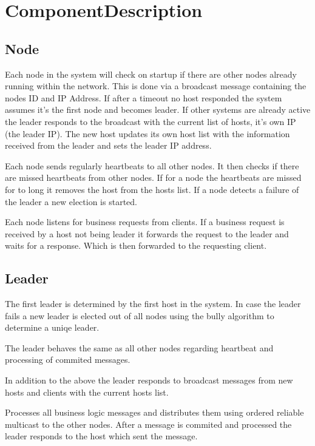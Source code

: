 \chapter{ComponentDescription}\label{ch:Component Description}
\section{Node}\label{Node}
Each node in the system will check on startup if there are other nodes already running within the network. This is done via a broadcast message containing the nodes ID and IP Address. If after a timeout no host responded the system assumes it's the first node and becomes leader. If other systems are already active the leader responds to the broadcast with the current list of hosts, it's own IP (the leader IP). The new host updates its own host list with the information received from the leader and sets the leader IP address. 

Each node sends regularly heartbeats to all other nodes. It then checks if there are missed heartbeats from other nodes. If for a node the heartbeats are missed for to long it removes the host from the hosts list.
If a node detects a failure of the leader a new election is started.

Each node listens for business requests from clients. If a business request is received by a host not being leader it forwards the request to the leader and waits for a response. Which is then forwarded to the requesting client.

\section{Leader}\label{sec:Leader}
The first leader is determined by the first host in the system. 
In case the leader fails a new leader is elected out of all nodes using the bully algorithm to determine a uniqe leader.

The leader behaves the same as all other nodes regarding heartbeat and processing of commited messages.

In addition to the above the leader responds to broadcast messages from new hosts and clients with the current hosts list.

Processes all business logic messages and distributes them using ordered reliable multicast to the other nodes. After a message is commited and processed the leader responds to the host which sent the message.



